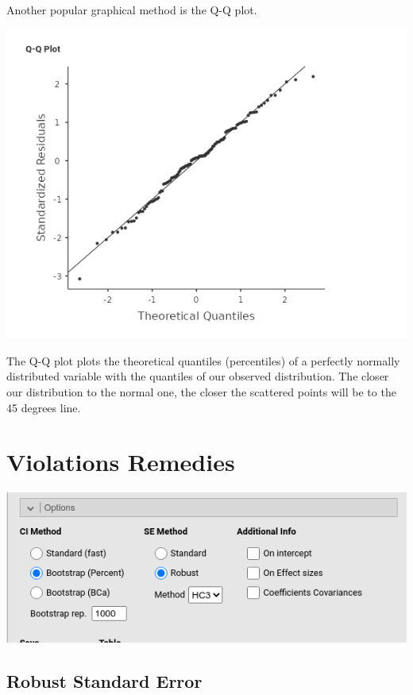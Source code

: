\documentclass[
]{book}
\begin{document}
Another popular graphical method is the Q-Q plot.

\includegraphics[width=8.08in]{bookletpics/2_assumptions_output5}

The Q-Q plot plots the theoretical quantiles (percentiles) of a perfectly normally distributed variable with the quantiles of our observed distribution. The closer our distribution to the normal one, the closer the scattered points will be to the 45 degrees line.

\hypertarget{violations-remedies}{%
\section{Violations Remedies}\label{violations-remedies}}

\includegraphics[width=7.94in]{bookletpics/2_options_input1}

\hypertarget{robust-standard-error}{%
\subsection{Robust Standard Error}\label{robust-standard-error}}
\end{document}
